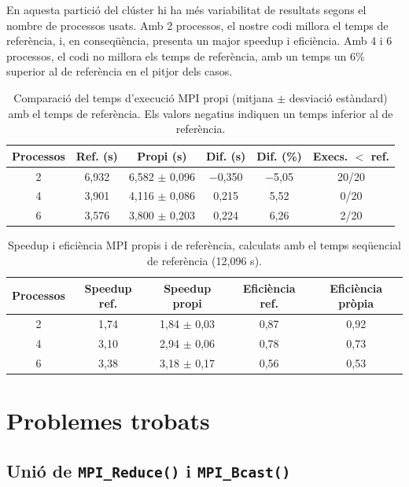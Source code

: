 \documentclass{article}
\begin{document}
En aquesta partició del clúster hi ha més variabilitat de resultats segons el nombre de processos usats. Amb 2 processos, el nostre codi millora el temps de referència, i, en conseqüència, presenta un major speedup i eficiència. Amb 4 i 6 processos, el codi no millora els temps de referència, amb un temps un 6\% superior al de referència en el pitjor dels casos.
\begin{table}[H]
\centering
\begin{tabular}{|c|c|c|c|c|c|}
\hline
\textbf{Processos} & \textbf{Ref. (s)} & \textbf{Propi (s)} & \textbf{Dif. (s)} & \textbf{Dif. (\%)} & \textbf{Execs. $<$ ref.} \\ \hline
2 & 6,932 & 6,582 $\pm$ 0,096 & $-$0,350 & $-$5,05 & 20/20 \\ \hline
4 & 3,901 & 4,116 $\pm$ 0,086 & 0,215 & 5,52 & 0/20 \\ \hline
6 & 3,576 & 3,800 $\pm$ 0,203 & 0,224 & 6,26 & 2/20 \\ \hline
\end{tabular}
\caption{Comparació del temps d'execució MPI propi (mitjana $\pm$ desviació estàndard) amb el temps de referència. Els valors negatius indiquen un temps inferior al de referència.}
\label{tab:mpi_comp_temps}
\end{table}

\begin{table}[H]
\centering
\begin{tabular}{|c|c|c|c|c|}
\hline
\textbf{Processos} & \textbf{Speedup ref.} & \textbf{Speedup propi} & \textbf{Eficiència ref.} & \textbf{Eficiència pròpia} \\ \hline
2 & 1,74 & 1,84 $\pm$ 0,03 & 0,87 & 0,92 \\ \hline
4 & 3,10 & 2,94 $\pm$ 0,06 & 0,78 & 0,73 \\ \hline
6 & 3,38 & 3,18 $\pm$ 0,17 & 0,56 & 0,53 \\ \hline
\end{tabular}
\caption{Speedup i eficiència MPI propis i de referència, calculats amb el temps seqüencial de referència (12,096 s).}
\label{tab:mpi_comp_speedup}
\end{table}

\newpage
\section{Problemes trobats}

\subsection{Unió de \texttt{\textbf{MPI\_Reduce()}} i \texttt{\textbf{MPI\_Bcast()}}}
\end{document}
